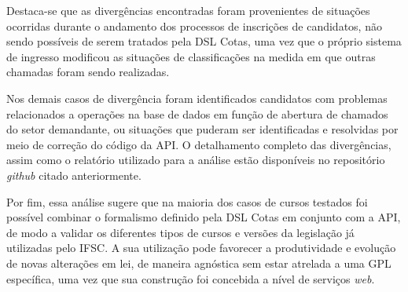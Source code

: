 Destaca-se que as divergências encontradas foram provenientes de situações ocorridas durante o andamento dos processos de inscrições de candidatos, não sendo possíveis de serem tratados pela DSL Cotas, uma vez que o próprio sistema de ingresso modificou as situações de classificações na medida em que outras chamadas foram sendo realizadas.

Nos demais casos de divergência foram identificados candidatos com problemas relacionados a operações na base de dados em função de abertura de chamados do setor demandante, ou situações que puderam ser identificadas e resolvidas por meio de correção do código da API. O detalhamento completo das divergências, assim como o relatório utilizado para a análise estão disponíveis no repositório \textit{github} citado anteriormente.

Por fim, essa análise sugere que na maioria dos casos de cursos testados foi possível combinar o formalismo definido pela DSL Cotas em conjunto com a API, de modo a validar os diferentes tipos de cursos e versões da legislação já utilizadas pelo \gls{IFSC}. A sua utilização pode favorecer a produtividade e evolução de novas alterações em lei, de maneira agnóstica sem estar atrelada a uma \gls{GPL} específica, uma vez que sua construção foi concebida a nível de serviços \textit{web}.